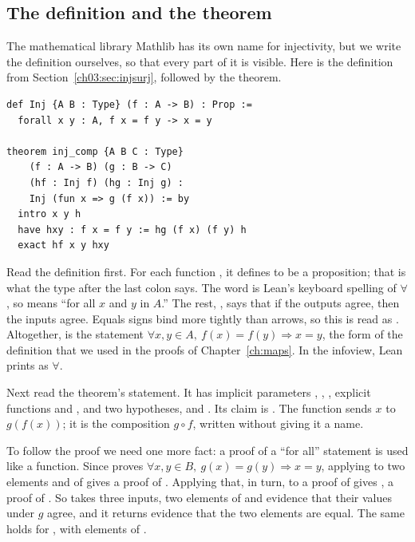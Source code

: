 \subsection*{The definition and the theorem}
The mathematical library Mathlib has its own name for injectivity, but we write the definition ourselves, so that every part of it is visible. Here is the definition from Section~\ref{ch03:sec:injsurj}, followed by the theorem.
\par\noindent\begin{minipage}{\linewidth}
\begin{lstlisting}
def Inj {A B : Type} (f : A -> B) : Prop :=
  forall x y : A, f x = f y -> x = y

theorem inj_comp {A B C : Type}
    (f : A -> B) (g : B -> C)
    (hf : Inj f) (hg : Inj g) :
    Inj (fun x => g (f x)) := by
  intro x y h
  have hxy : f x = f y := hg (f x) (f y) h
  exact hf x y hxy
\end{lstlisting}
\end{minipage}\par

Read the definition first. For each function , it defines  to be a proposition; that is what the type  after the last colon says. The word  is Lean's keyboard spelling of $\forall$, so  means ``for all $x$ and $y$ in $A$.'' The rest, , says that if the outputs agree, then the inputs agree. Equals signs bind more tightly than arrows, so this is read as . Altogether,  is the statement $\forall x,y\in A,\ f(x)=f(y)\Rightarrow x=y$, the form of the definition that we used in the proofs of Chapter~\ref{ch:maps}. In the infoview, Lean prints  as $\forall$.

Next read the theorem's statement. It has implicit parameters , , , explicit functions  and , and two hypotheses,  and . Its claim is . The function  sends $x$ to $g(f(x))$; it is the composition $g\circ f$, written without giving it a name.

To follow the proof we need one more fact: a proof of a ``for all'' statement is used like a function. Since  proves $\forall x,y\in B,\ g(x)=g(y)\Rightarrow x=y$, applying  to two elements  and  of  gives a proof of . Applying that, in turn, to a proof  of  gives , a proof of . So  takes three inputs, two elements of  and evidence that their values under $g$ agree, and it returns evidence that the two elements are equal. The same holds for , with elements of .

